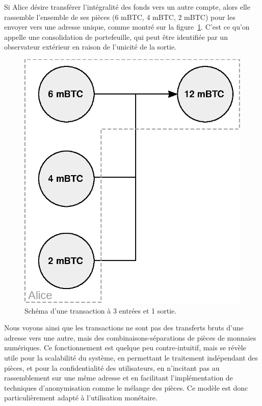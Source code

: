 Si Alice désire transférer l'intégralité des fonds vers un autre compte, alors elle rassemble l'ensemble de ses pièces (6 mBTC, 4 mBTC, 2 mBTC) pour les envoyer vers une adresse unique, comme montré sur la figure~\ref{fig:transaction-3i-1o}. C'est ce qu'on appelle une consolidation de portefeuille, qui peut être identifiée par un observateur extérieur en raison de l'unicité de la sortie.

\begin{figure}[ht]
  \centering
  \includegraphics[scale=0.75]{img/transaction-3i-1o.eps}
  \caption{Schéma d'une transaction à 3 entrées et 1 sortie.}
  \label{fig:transaction-3i-1o}
\end{figure}

Nous voyons ainsi que les transactions ne sont pas des transferts bruts d'une adresse vers une autre, mais des combinaisons-séparations de pièces de monnaies numériques. Ce fonctionnement est quelque peu contre-intuitif, mais se révèle utile pour la scalabilité du système, en permettant le traitement indépendant des pièces, et pour la confidentialité des utilisateurs, en n'incitant pas au rassemblement sur une même adresse et en facilitant l'implémentation de techniques d'anonymisation comme le mélange des pièces. Ce modèle est donc particulièrement adapté à l'utilisation monétaire.

